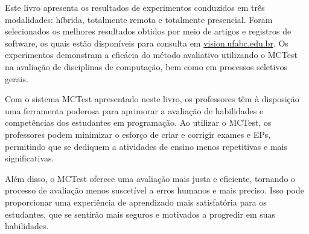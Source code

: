 Este livro apresenta os resultados de experimentos conduzidos em três modalidades: híbrida, totalmente remota e totalmente presencial. Foram selecionados os melhores resultados obtidos por meio de artigos e registros de software, os quais estão disponíveis para consulta em \href{http://vision.ufabc.edu.br}{vision.ufabc.edu.br}. Os experimentos demonstram a eficácia do método avaliativo utilizando o MCTest na avaliação de disciplinas de computação, bem como em processos seletivos gerais.

Com o sistema MCTest apresentado neste livro, os professores têm à disposição uma ferramenta poderosa para aprimorar a avaliação de habilidades e competências dos estudantes em programação. Ao utilizar o MCTest, os professores podem minimizar o esforço de criar e corrigir exames e EPs, permitindo que se dediquem a atividades de ensino menos repetitivas e mais significativas.

Além disso, o MCTest oferece uma avaliação mais justa e eficiente, tornando o processo de avaliação menos suscetível a erros humanos e mais preciso. Isso pode proporcionar uma experiência de aprendizado mais satisfatória para os estudantes, que se sentirão mais seguros e motivados a progredir em suas habilidades.
 


